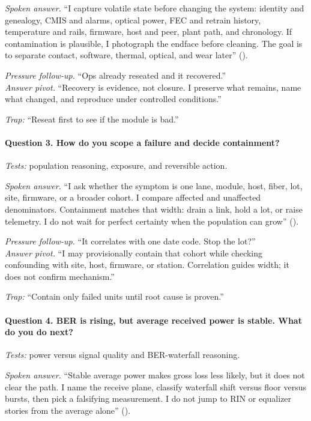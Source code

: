 \textit{Spoken answer.}
``I capture volatile state before changing the system: identity and genealogy,
CMIS and alarms, optical power, FEC and retrain history, temperature and rails,
firmware, host and peer, plant path, and chronology. If contamination is
plausible, I photograph the endface before cleaning. The goal is to separate
contact, software, thermal, optical, and wear later''
().

\textit{Pressure follow-up.} ``Ops already reseated and it recovered.''\\
\textit{Answer pivot.} ``Recovery is evidence, not closure. I preserve what
remains, name what changed, and reproduce under controlled conditions.''

\textit{Trap:} ``Reseat first to see if the module is bad.''

\paragraph{Question 3. How do you scope a failure and decide containment?}
\textit{Tests:} population reasoning, exposure, and reversible action.

\textit{Spoken answer.}
``I ask whether the symptom is one lane, module, host, fiber, lot, site,
firmware, or a broader cohort. I compare affected and unaffected denominators.
Containment matches that width: drain a link, hold a lot, or raise telemetry. I
do not wait for perfect certainty when the population can grow''
().

\textit{Pressure follow-up.} ``It correlates with one date code. Stop the lot?''\\
\textit{Answer pivot.} ``I may provisionally contain that cohort while checking
confounding with site, host, firmware, or station. Correlation guides width; it
does not confirm mechanism.''

\textit{Trap:} ``Contain only failed units until root cause is proven.''

\paragraph{Question 4. BER is rising, but average received power is stable. What
do you do next?}
\textit{Tests:} power versus signal quality and BER-waterfall reasoning.

\textit{Spoken answer.}
``Stable average power makes gross loss less likely, but it does not clear the
path. I name the receive plane, classify waterfall shift versus floor versus
bursts, then pick a falsifying measurement. I do not jump to RIN or equalizer
stories from the average alone''
().

